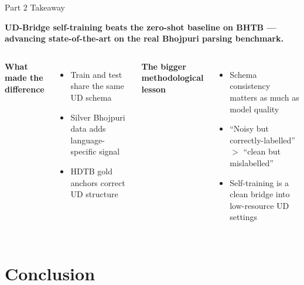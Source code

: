 \documentclass[aspectratio=169,10pt]{beamer}
\newcommand{\bho}{Bhojpuri}
\begin{document}
\begin{frame}{Part 2 Takeaway}
\vspace{0.5cm}
\begin{center}
\colorbox{comp2!15}{\parbox{0.85\textwidth}{\centering\large
\textbf{UD-Bridge self-training beats the zero-shot baseline on BHTB --- advancing state-of-the-art on the real \bho{} parsing benchmark.}
}}
\end{center}

\vspace{0.7cm}
\begin{columns}[T]
\textbf{What made the difference}
\begin{itemize}
  \item Train and test share the same UD schema
  \item Silver \bho{} data adds language-specific signal
  \item HDTB gold anchors correct UD structure
\end{itemize}

\textbf{The bigger methodological lesson}
\begin{itemize}
  \item Schema consistency matters as much as model quality
  \item ``Noisy but correctly-labelled'' $>$ ``clean but mislabelled''
  \item Self-training is a clean bridge into low-resource UD settings
\end{itemize}
\end{columns}
\end{frame}

\section{Conclusion}
\end{document}
